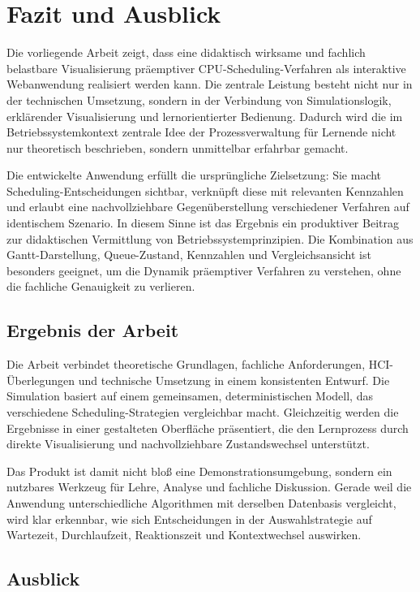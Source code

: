 \chapter{Fazit und Ausblick}

Die vorliegende Arbeit zeigt, dass eine didaktisch wirksame und fachlich belastbare Visualisierung präemptiver CPU-Scheduling-Verfahren als interaktive Webanwendung realisiert werden kann. Die zentrale Leistung besteht nicht nur in der technischen Umsetzung, sondern in der Verbindung von Simulationslogik, erklärender Visualisierung und lernorientierter Bedienung. Dadurch wird die im Betriebssystemkontext zentrale Idee der Prozessverwaltung für Lernende nicht nur theoretisch beschrieben, sondern unmittelbar erfahrbar gemacht.

Die entwickelte Anwendung erfüllt die ursprüngliche Zielsetzung: Sie macht Scheduling-Entscheidungen sichtbar, verknüpft diese mit relevanten Kennzahlen und erlaubt eine nachvollziehbare Gegenüberstellung verschiedener Verfahren auf identischem Szenario. In diesem Sinne ist das Ergebnis ein produktiver Beitrag zur didaktischen Vermittlung von Betriebssystemprinzipien. Die Kombination aus Gantt-Darstellung, Queue-Zustand, Kennzahlen und Vergleichsansicht ist besonders geeignet, um die Dynamik präemptiver Verfahren zu verstehen, ohne die fachliche Genauigkeit zu verlieren.

\section{Ergebnis der Arbeit}

Die Arbeit verbindet theoretische Grundlagen, fachliche Anforderungen, HCI-Überlegungen und technische Umsetzung in einem konsistenten Entwurf. Die Simulation basiert auf einem gemeinsamen, deterministischen Modell, das verschiedene Scheduling-Strategien vergleichbar macht. Gleichzeitig werden die Ergebnisse in einer gestalteten Oberfläche präsentiert, die den Lernprozess durch direkte Visualisierung und nachvollziehbare Zustandswechsel unterstützt.

Das Produkt ist damit nicht bloß eine Demonstrationsumgebung, sondern ein nutzbares Werkzeug für Lehre, Analyse und fachliche Diskussion. Gerade weil die Anwendung unterschiedliche Algorithmen mit derselben Datenbasis vergleicht, wird klar erkennbar, wie sich Entscheidungen in der Auswahlstrategie auf Wartezeit, Durchlaufzeit, Reaktionszeit und Kontextwechsel auswirken.

\section{Ausblick}

